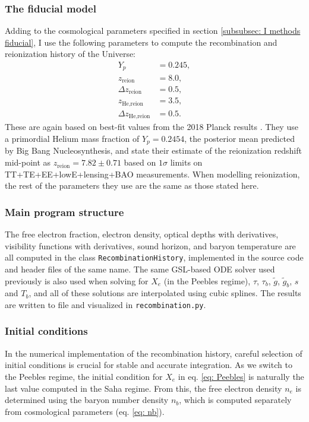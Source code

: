 \documentclass{aa}
\numberwithin{equation}{section}
\numberwithin{table}{section}
\numberwithin{figure}{section}
\begin{document}
\subsubsection{The fiducial model}
Adding to the cosmological parameters specified in section \ref{subsubsec: I methods fiducial}, I use the following parameters to compute the recombination and reionization history of the Universe:
\begin{align*}
  Y_p &= 0.245,
  \\
  z_\text{reion} &= 8.0,
  \\
  \Delta z_\text{reion} &= 0.5,
  \\
  z_\text{He,reion} &= 3.5,
  \\
  \Delta z_\text{He,reion} &= 0.5.
\end{align*}
These are again based on best-fit values from the 2018 Planck results \citep[see][]{Planck}. They use a primordial Helium mass fraction of $Y_p=0.2454$, the posterior mean predicted by Big Bang Nucleosynthesis, and state their estimate of the reionization redshift mid-point as $z_\text{reion}=7.82\pm0.71$ based on $1\sigma$ limits on TT+TE+EE+lowE+lensing+BAO measurements. When modelling reionization, the rest of the parameters they use are the same as those stated here.

\subsubsection{Main program structure}
The free electron fraction, electron density, optical depths with derivatives, visibility functions with derivatives, sound horizon, and baryon temperature are all computed in the class \verb|RecombinationHistory|, implemented in the source code and header files of the same name. The same GSL-based ODE solver used previously is also used when solving for $X_e$ (in the Peebles regime), $\tau$, $\tau_b$, $\tilde{g}$, $\tilde{g}_b$, $s$ and $T_b$, and all of these solutions are interpolated using cubic splines. The results are written to file and visualized in \verb|recombination.py|. 


\subsubsection{Initial conditions}
In the numerical implementation of the recombination history, careful selection of initial conditions is crucial for stable and accurate integration. As we switch to the Peebles regime, the initial condition for $X_e$ in eq. \eqref{eq: Peebles} is naturally the last value computed in the Saha regime. From this, the free electron density $n_e$ is determined using the baryon number density $n_b$, which is computed separately from cosmological parameters (eq. \eqref{eq: nb}). 
\end{document}
